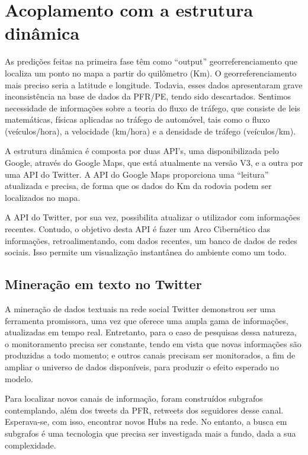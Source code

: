 \pagebreak

\section{Acoplamento com a estrutura dinâmica}

As predições feitas na primeira fase têm como ``output'' georreferenciamento que localiza um ponto no mapa a partir do quilômetro (Km). O georreferenciamento mais preciso seria a latitude e longitude. Todavia, esses dados apresentaram grave inconsistência na base de dados da PFR/PE, tendo sido descartados. Sentimos necessidade de informações sobre a teoria do fluxo de tráfego, que consiste de leis matemáticas, físicas aplicadas ao tráfego de automóvel, tais como o fluxo (veículos/hora), a velocidade (km/hora) e a densidade de tráfego (veículos/km).

A estrutura dinâmica é composta por duas API's, uma disponibilizada pelo Google, através do Google Maps, que está atualmente na versão V3, e a
outra por uma API do Twitter. A API do Google Maps proporciona uma ``leitura'' atualizada e precisa, de forma que os dados do Km da rodovia podem ser localizados no mapa.

A API do Twitter, por sua vez, possibilita atualizar o utilizador com informações recentes. Contudo, o objetivo desta API é fazer 
um Arco Cibernético das informações, retroalimentando, com dados recentes, um banco de dados de redes sociais. Isso permite um visualização 
instantânea do ambiente como um todo.


\subsection{Mineração em texto no Twitter}

A mineração de dados textuais na rede social Twitter demonstrou ser uma ferramenta promissora, uma vez que oferece uma ampla gama de informações, atualizadas em tempo real. Entretanto, para o caso de pesquisas dessa natureza, o monitoramento precisa ser constante, tendo em vista que novas informações são produzidas a todo momento; e outros canais precisam ser monitorados, a fim de ampliar o universo de dados disponíveis, para produzir o efeito esperado no modelo.

Para localizar novos canais de informação, foram construídos subgrafos contemplando, além dos tweets da PFR, retweets dos seguidores desse canal. Esperava-se, com isso, encontrar novos Hubs na rede. No entanto, a busca em subgrafos é uma tecnologia que precisa ser investigada mais a fundo, dada a sua complexidade.

